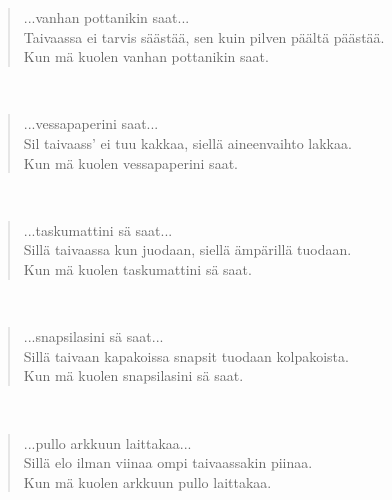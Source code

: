 \noindent\begin{minipage}{\linewidth}
\begin{verse}
	...vanhan pottanikin saat...\\
	Taivaassa ei tarvis säästää, sen kuin pilven päältä päästää.\\
	Kun mä kuolen vanhan pottanikin saat.\\
\end{verse}
\end{minipage}\\[10pt]
\noindent\begin{minipage}{\linewidth}
\begin{verse}
	...vessapaperini saat...\\
	Sil taivaass' ei tuu kakkaa, siellä aineenvaihto lakkaa.\\
	Kun mä kuolen vessapaperini saat.\\
\end{verse}
\end{minipage}\\[10pt]
\noindent\begin{minipage}{\linewidth}
\begin{verse}
	...taskumattini sä saat...\\
	Sillä taivaassa kun juodaan, siellä ämpärillä tuodaan.\\
	Kun mä kuolen taskumattini sä saat.\\
\end{verse}
\end{minipage}\\[10pt]
\noindent\begin{minipage}{\linewidth}
\begin{verse}
	...snapsilasini sä saat...\\
	Sillä taivaan kapakoissa snapsit tuodaan kolpakoista.\\
	Kun mä kuolen snapsilasini sä saat.\\
\end{verse}
\end{minipage}\\[10pt]
\noindent\begin{minipage}{\linewidth}
\begin{verse}
	...pullo arkkuun laittakaa...\\
	Sillä elo ilman viinaa ompi taivaassakin piinaa.\\
	Kun mä kuolen arkkuun pullo laittakaa.\\
\end{verse}
\end{minipage}\\[10pt]
